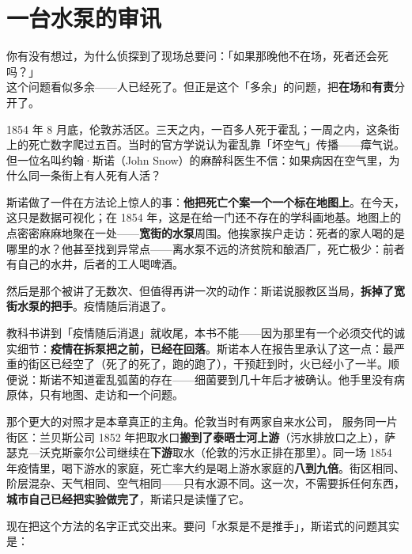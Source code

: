 \documentclass[../../main2.tex]{subfiles}
\begin{document}
	\section{一台水泵的审讯}
	\label{sec:contrib-snow}

	\begin{readingnote}
		你有没有想过，为什么侦探到了现场总要问：「如果那晚他不在场，死者还会死吗？」\\
		这个问题看似多余——人已经死了。但正是这个「多余」的问题，把\textbf{在场}和\textbf{有责}分开了。
	\end{readingnote}

	1854 年 8 月底，伦敦苏活区。三天之内，一百多人死于霍乱；一周之内，这条街上的死亡数字爬过五百。当时的官方学说认为霍乱靠「坏空气」传播——瘴气说。但一位名叫约翰·斯诺（John Snow）的麻醉科医生不信：如果病因在空气里，为什么同一条街上有人死有人活？

	斯诺做了一件在方法论上惊人的事：\textbf{他把死亡个案一个一个标在地图上}。在今天，这只是数据可视化；在 1854 年，这是在给一门还不存在的学科画地基。地图上的点密密麻麻地聚在一处——\textbf{宽街的水泵}周围。他挨家挨户走访：死者的家人喝的是哪里的水？他甚至找到异常点——离水泵不远的济贫院和酿酒厂，死亡极少：前者有自己的水井，后者的工人喝啤酒。

	然后是那个被讲了无数次、但值得再讲一次的动作：斯诺说服教区当局，\textbf{拆掉了宽街水泵的把手}。疫情随后消退了。

	教科书讲到「疫情随后消退」就收尾，本书不能——因为那里有一个必须交代的诚实细节：\textbf{疫情在拆泵把之前，已经在回落}。斯诺本人在报告里承认了这一点：最严重的街区已经空了（死了的死了，跑的跑了），干预赶到时，火已经小了一半。顺便说：斯诺不知道霍乱弧菌的存在——细菌要到几十年后才被确认。他手里没有病原体，只有地图、走访和一个问题。

那个更大的对照才是本章真正的主角。伦敦当时有两家自来水公司， 服务同一片街区：兰贝斯公司 1852 年把取水口\textbf{搬到了泰晤士河上游}（污水排放口之上），萨瑟克—沃克斯豪尔公司继续在\textbf{下游}取水（伦敦的污水正排在那里）。同一场 1854 年疫情里，喝下游水的家庭，死亡率大约是喝上游水家庭的\textbf{八到九倍}。街区相同、阶层混杂、天气相同、空气相同——只有水源不同。这一次，不需要拆任何东西，\textbf{城市自己已经把实验做完了}，斯诺只是读懂了它。

现在把这个方法的名字正式交出来。要问「水泵是不是推手」，斯诺式的问题其实是：
\end{document}
